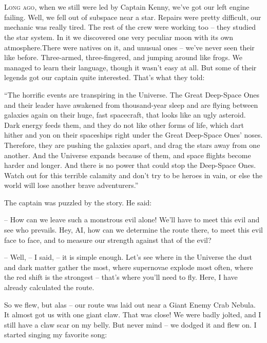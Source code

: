 \documentclass[ebook,twoside,final,openright]{memoir}
\begin{document}
\chapter{}
\par
\lettrine{L}{ong ago,} when we still were led by Captain Kenny, we’ve got our left engine failing. Well, we fell out of subspace near a star. Repairs were pretty difficult, our mechanic was really tired. The rest of the crew were working too – they studied the star system. In it we discovered one very peculiar moon with its own atmosphere.There were natives on it, and unusual ones – we’ve never seen their like before. Three-armed, three-fingered, and jumping around like frogs. We managed to learn their language, though it wasn’t easy at all. But some of their legends got our captain quite interested. That’s what they told:\par
\par
“The horrific events are transpiring in the Universe. The Great Deep-Space Ones and their leader have awakened from thousand-year sleep and are flying between galaxies again on their huge, fast spacecraft, that looks like an ugly asteroid. Dark energy feeds them, and they do not like other forms of life, which dart hither and yon on their spaceships right under the Great Deep-Space Ones’ noses. Therefore, they are pushing the galaxies apart, and drag the stars away from one another. And the Universe expands because of them, and space flights become harder and longer. And there is no power that could stop the Deep-Space Ones. Watch out for this terrible calamity and don’t try to be heroes in vain, or else the world will lose another brave adventurers.”\par
\par
The captain was puzzled by the story. He said:\par
– How can we leave such a monstrous evil alone! We'll have to meet this evil and see who prevails. Hey, AI, how can we determine the route there, to meet this evil face to face, and to measure our strength against that of the evil?\par
– Well, – I said, – it is simple enough. Let's see where in the Universe the dust and dark matter gather the most, where supernovae explode most often, where the red shift is the strongest – that’s where you’ll need to fly. Here, I have already calculated the route.\par
So we flew, but alas – our route was laid out near a Giant Enemy Crab Nebula. It almost got us with one giant claw. That was close! We were badly jolted, and I still have a claw scar on my belly. But never mind – we dodged it and flew on. I started singing my favorite song: \par
\end{document}
